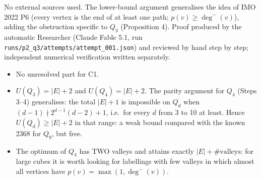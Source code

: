 No external sources used. The lower-bound argument generalises the idea
of IMO 2022 P6 (every vertex is the end of at least one path;
\(p(v)\ge\deg^-(v)\)), adding the obstruction specific to \(Q_3\)
(Proposition 4). Proof produced by the automatic Researcher (Claude
Fable 5.1, run \texttt{runs/p2\_q3/attempts/attempt\_001.json}) and
reviewed by hand step by step; independent numerical verification
written separately.


\begin{itemize}
\tightlist
\item
  No unresolved part for C1.
\item
  \(U(Q_3)=|E|+2\) and \(U(Q_4)=|E|+2\). The parity argument for \(Q_4\)
  (Steps 3--4) generalises: the total \(|E|+1\) is impossible on \(Q_d\)
  when \((d-1)\nmid 2^{d-1}(d-2)+1\), i.e.~for every \(d\) from 3 to 10
  at least. Hence \(U(Q_d)\ge|E|+2\) in that range: a weak bound
  compared with the known 2368 for \(Q_9\), but free.
\item
  The optimum of \(Q_4\) has TWO valleys and attains exactly
  \(|E|+\#\text{valleys}\): for large cubes it is worth looking for
  labellings with few valleys in which almost all vertices have
  \(p(v)=\max(1,\deg^-(v))\).
\end{itemize}


